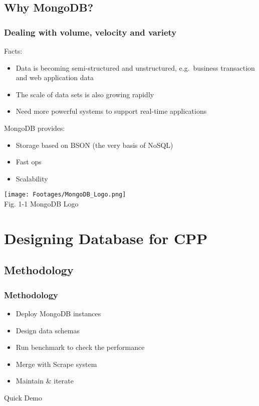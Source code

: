 \documentclass{beamer}
\begin{document}
\subsection{Why MongoDB?}
\begin{frame}
\frametitle{Dealing with volume, velocity and variety}
Facts:
\begin{itemize}
  \item Data is becoming semi-structured and unstructured, e.g.\ business transaction and web application data
  \item The scale of data sets is also growing rapidly
  \item Need more powerful systems to support real-time applications
\end{itemize}
MongoDB provides:
\begin{itemize}
  \item Storage based on BSON (the very basis of NoSQL)
  \item Fast ops
  \item Scalability
\end{itemize}
\begin{center}
  \texttt{[image: Footages/MongoDB\_Logo.png]}\\
  \scriptsize Fig. 1-1 MongoDB Logo
 \end{center}
\end{frame}

\section{Designing Database for CPP}

\subsection{Methodology}
\begin{frame}
\frametitle{Methodology}
\begin{itemize}
  \item Deploy MongoDB instances
  \item Design data schemas
  \item Run benchmark to check the performance
  \item Merge with Scrape system
  \item Maintain \& iterate
\end{itemize}\end{frame}
\begin{frame}
\begin{center}
\LARGE Quick Demo
\end{center}
\end{frame}
\end{document}
